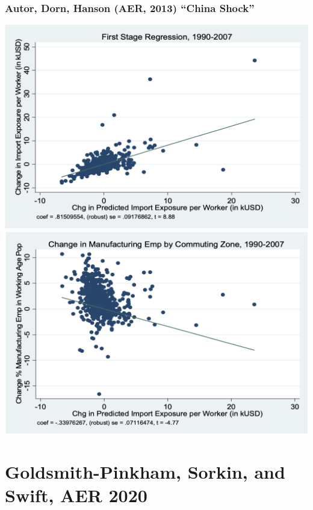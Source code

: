 \documentclass[english,xcolor=svgnames]{beamer}
\begin{document}
\begin{frame}
\frametitle[alignment=center]{Autor, Dorn, Hanson (AER, 2013) ``China Shock''}
\centering
\includegraphics[scale=0.325]{figures/ADHFIG1.png}\includegraphics[scale=0.325]{figures/ADHFIG2.png}
\end{frame}





\section{Goldsmith-Pinkham, Sorkin, and Swift, AER 2020}
\end{document}
